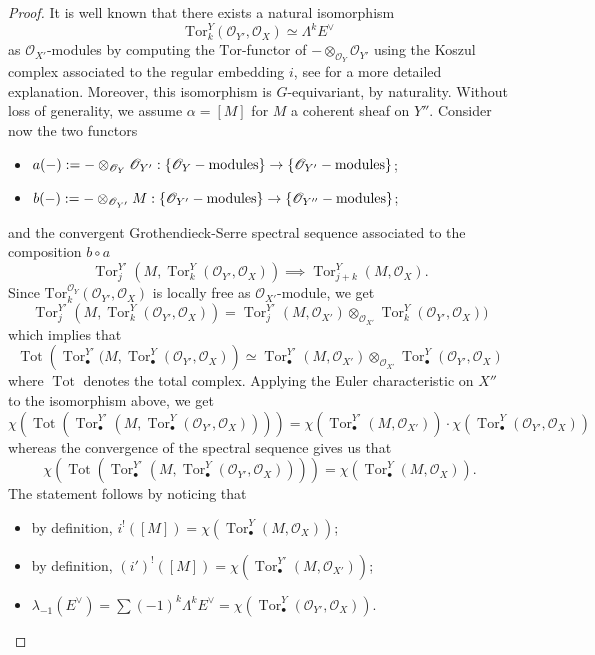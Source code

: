 \documentclass[12pt]{amsart}
\newcommand{\sO}{\mathscr{O}}
\theoremstyle{definition}
\begin{document}
\begin{proof}
    It is well known that there exists a natural isomorphism
    \[
        \mathrm{Tor}_k^{Y}(\sO_{Y'},\sO_X)\simeq\Lambda^k E^{\vee}
    \]
    as $\sO_{X'}$-modules by computing the $\mathrm{Tor}$-functor of $- \otimes_{\sO_{Y}} \sO_{Y'}$ using the Koszul complex associated to the regular embedding $i$, see \cite[Lemma 3.2]{Thomason-blowup} for a more detailed explanation. Moreover, this isomorphism is $G$-equivariant, by naturality. Without loss of generality, we assume $\alpha=[M]$ for $M$ a coherent sheaf on $Y''$.  Consider now the two functors
    \begin{itemize}
        \item $a(-):=- \otimes_{\sO_Y} \sO_{Y'}: \{ \sO_Y- {\rm modules}\} \rightarrow  \{ \sO_{Y'}-{\rm modules}\}  $;
        \item $b(-):=- \otimes_{\sO_{Y'}} M: \{ \sO_{Y'}- {\rm modules}\} \rightarrow  \{ \sO_{Y''}- {\rm modules}\} $;
    \end{itemize}
      and the convergent Grothendieck-Serre spectral sequence associated to the composition $b\circ a$ 
    $$ \operatorname{Tor}_j^{Y'}(M, \operatorname{Tor}_k^{Y}(\sO_{Y'},\sO_X)) \implies \operatorname{Tor}_{j+k}^Y(M,\sO_X). $$
    Since $ \mathrm{Tor}_k^{\sO_Y}(\sO_{Y'},\sO_X)$ is locally free as $\sO_{X'}$-module, we get
    $$  \operatorname{Tor}_j^{Y'}(M, \operatorname{Tor}_k^{Y}(\sO_{Y'},\sO_X)) =  \operatorname{Tor}_j^{Y'}(M, \sO_{X'}) \otimes_{\sO_{X'}} \operatorname{Tor}_k^{Y}(\sO_{Y'},\sO_X))$$
    which implies that
    $$ \operatorname{Tot}\left( \operatorname{Tor}_{\bullet}^{Y'}(M, \operatorname{Tor}_{\bullet}^{Y}(\sO_{Y'},\sO_X)\right)\simeq \operatorname{Tor}_{\bullet}^{Y'}(M, \sO_{X'}) \otimes_{\sO_{X'}} \operatorname{Tor}_{\bullet}^{Y}(\sO_{Y'},\sO_X)$$
    where $\operatorname{Tot}$ denotes the total complex.
    Applying the Euler characteristic on $X''$ to the isomorphism above, we get 
    $$\chi\left(\operatorname{Tot}\left(\operatorname{Tor}_{\bullet}^{Y'}\left(M, \operatorname{Tor}_{\bullet}^{Y}(\sO_{Y'},\sO_X)\right)\right)\right) =\chi(\operatorname{Tor}_{\bullet}^{Y'}(M, \sO_{X'})) \cdot\chi(\operatorname{Tor}_{\bullet}^{Y}(\sO_{Y'},\sO_X))$$ 
    whereas the convergence of the spectral sequence gives us that
    $$ \chi\left(\operatorname{Tot}\left(\operatorname{Tor}_{\bullet}^{Y'}\left(M, \operatorname{Tor}_{\bullet}^{Y}(\sO_{Y'},\sO_X)\right)\right)\right)= \chi \left( \operatorname{Tor}_{\bullet}^Y(M,\sO_X) \right).$$
    The statement follows by noticing that 
    \begin{itemize}
        \item by definition, $i^!([M])=  \chi \left( \operatorname{Tor}_{\bullet}^Y(M,\sO_X) \right)$;
        \item by definition, $(i')^!([M])=  \chi \left( \operatorname{Tor}_{\bullet}^{Y'}(M,\sO_{X'}) \right)$;
        \item $\lambda_{-1}(E^{\vee})=\sum (-1)^k \Lambda^k E^{\vee} = \chi(\operatorname{Tor}_{\bullet}^{Y}(\sO_{Y'},\sO_X))$.
    \end{itemize}
\end{proof}
\end{document}

